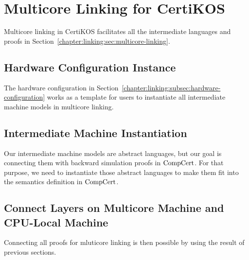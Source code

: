 \section{Multicore Linking for CertiKOS}
\label{chapter:certikos:sec:multicore-linking-for-certikos}

Multicore linking in CertiKOS facilitates all the intermediate languages
and proofs in Section~\ref{chapter:linking:sec:multicore-linking}.

\subsection{Hardware Configuration Instance}
\label{chapter:certikos:subsec:hardware-configuration-instance}

The hardware configuration in Section~\ref{chapter:linking:subsec:hardware-configuration} works as a 
template for users to instantiate all intermediate machine models in multicore linking. 


\subsection{Intermediate Machine Instantiation}
\label{chapter:certikos:subsec:intermediate-machine-instantiation}

Our intermediate machine models are abstract languages, but 
our goal is connecting them with backward simulation proofs in $\mathrm{CompCert}$. 
For that purpose, 
we need to instantiate those abstract languages to make them fit into 
the semantics definition in $\mathrm{CompCert}$.


\subsection{Connect Layers on Multicore Machine and CPU-Local Machine}
\label{chapter:certikos:subsec:connect-multicore}

Connecting all proofs for mluticore linking is then possible by using the result of previous sections.